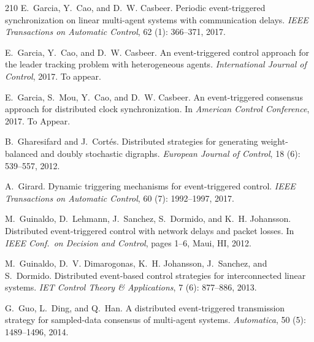 \documentclass{autart}
\begin{document}
{\begin{thebibliography}{210}
E.~Garcia, Y.~Cao, and D.~W. Casbeer.
\newblock Periodic event-triggered synchronization on linear multi-agent
  systems with communication delays.
\newblock \emph{IEEE Transactions on Automatic Control}, 62
  (1): 366--371, 2017{}.

E.~Garcia, Y.~Cao, and D.~W. Casbeer.
\newblock An event-triggered control approach for the leader tracking problem
  with heterogeneous agents.
\newblock \emph{International Journal of Control}, 2017{}.
\newblock To appear.

E.~Garcia, S.~Mou, Y.~Cao, and D.~W. Casbeer.
\newblock An event-triggered consensus approach for distributed clock
  synchronization.
\newblock In \emph{{A}merican {C}ontrol {C}onference}, 2017{}.
\newblock To Appear.

B.~Gharesifard and J.~Cort{\'e}s.
\newblock Distributed strategies for generating weight-balanced and doubly
  stochastic digraphs.
\newblock \emph{European Journal of Control}, 18 (6):
  539--557, 2012.

A.~Girard.
\newblock Dynamic triggering mechanisms for event-triggered control.
\newblock \emph{IEEE Transactions on Automatic Control}, 60
  (7): 1992--1997, 2017.

M.~Guinaldo, D.~Lehmann, J.~Sanchez, S.~Dormido, and K.~H. Johansson.
\newblock Distributed event-triggered control with network delays and packet
  losses.
\newblock In \emph{{IEEE} Conf.\ on Decision and Control}, pages 1--6, Maui,
  HI, 2012.

M.~Guinaldo, D.~V. Dimarogonas, K.~H. Johansson, J.~Sanchez, and S.~Dormido.
\newblock Distributed event-based control strategies for interconnected linear
  systems.
\newblock \emph{IET Control Theory \& Applications}, 7 (6):
  877--886, 2013.

G.~Guo, L.~Ding, and Q.~Han.
\newblock A distributed event-triggered transmission strategy for sampled-data
  consensus of multi-agent systems.
\newblock \emph{Automatica}, 50 (5): 1489--1496, 2014.


\end{thebibliography}}
\end{document}
